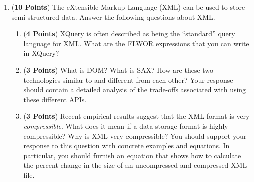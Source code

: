 \documentclass[12pt]{article}
\begin{document}
\begin{enumerate}

 
\newpage

\item ({\bf 10 Points}) The eXtensible Markup Language (XML) can be
  used to store semi-structured data.  Answer the following questions
  about XML.

  \begin{enumerate}
    
    \item ({\bf 4 Points}) XQuery is often described as being the
      ``standard'' query language for XML.  What are the FLWOR
      expressions that you can write in XQuery?

      \item ({\bf 3 Points}) What is DOM?  What is SAX?  How are these
      two technologies similar to and different from each other?  Your
      response should contain a detailed analysis of the trade-offs 
      associated with using these different APIs.

    \item ({\bf 3 Points}) Recent empirical results suggest that the
      XML format is very {\em compressible}.  What does it mean if a
      data storage format is highly compressible?  Why is XML very
      compressible?  You should support your response to this question
      with concrete examples and equations.  In particular, you should
      furnish an equation that shows how to calculate the percent
      change in the size of an uncompressed and compressed XML file.

    \end{enumerate}


\end{enumerate}
\end{document}
